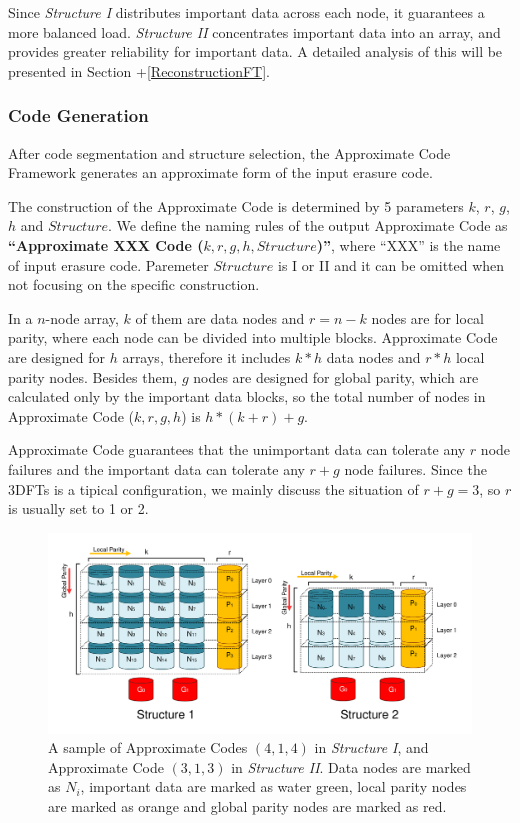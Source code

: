 \documentclass[sigconf]{acmart}
\begin{document}
Since \emph{Structure I} distributes important data across each node, it guarantees a more balanced load. \emph{Structure II} concentrates important data into an array, and provides greater reliability for important data. A detailed analysis of this will be presented in Section +\ref{ReconstructionFT}.

\subsubsection{Code Generation}\label{code-gen}
After code segmentation and structure selection, the Approximate Code Framework generates an approximate form of the input erasure code.

The construction of the Approximate Code is determined by 5 parameters $k$, $r$, $g$, $h$ and $Structure$. 
We define the naming rules of the output Approximate Code as \textbf{``Approximate XXX Code ($k,r,g,h, Structure$)''}, where ``XXX'' is the name of input erasure code. Paremeter $Structure$ is I or II and it can be omitted when not focusing on the specific construction.

In a $n$-node array, $k$ of them are data nodes and $r=n-k$ nodes are for local parity, where each node can be divided into multiple blocks.
Approximate Code are designed for $h$ arrays, therefore it includes $k*h$ data nodes and $r*h$ local parity nodes.
Besides them, $g$ nodes are designed for global parity, which are calculated only by the important data blocks, so the total number of nodes in Approximate Code ($k,r,g,h$) is 
$h*(k+r) + g$.

Approximate Code guarantees that the unimportant data can tolerate any $r$ node failures and the important data can tolerate any $r+g$ node failures.
Since the 3DFTs is a tipical configuration, we mainly discuss the situation of $r+g=3$, so $r$ is usually set to 1 or 2.

\iffalse
\begin{figure}[]
\centering
\includegraphics[width=\linewidth]{photo/AP-kmha-v7.pdf}
\caption{A sample of Approximate Codes $(4,1,4)$ in \emph{Structure I}, and Approximate Code $(3,1,3)$ in \emph{Structure II}.
Data nodes are marked as $N_i$, important data are marked as water green, local parity nodes are marked as orange and global parity nodes are marked as red.
}
\label{fig-ap-414}
\end{figure}
\end{document}
